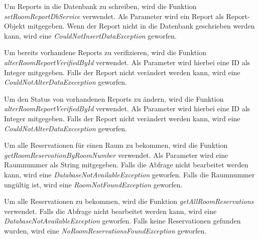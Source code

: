 

Um Reports in die Datenbank zu schreiben, wird die Funktion \emph{setRoomReportDbService} verwendet. Als Parameter wird ein Report als Report-Objekt mitgegeben. Wenn der Report nicht in die Datenbank geschrieben werden kann, wird eine \emph{CouldNotInsertDataException} geworfen.



Um bereits vorhandene Reports zu verifizieren, wird die Funktion \emph{alterRoomReportVerifiedById} verwendet. Als Parameter wird hierbei eine ID als Integer mitgegeben. Falls der Report nicht verändert werden kann, wird eine \emph{CouldNotAlterDataExcception} geworfen.


Um den Status von vorhandenen Reports zu ändern, wird die Funktion \emph{alterRoomReportVerifiedById} verwendet. Als Parameter wird hierbei eine ID als Integer mitgegeben. Falls der Report nicht verändert werden kann, wird eine \emph{CouldNotAlterDataExcception} geworfen.


Um alle Reservationen für einen Raum zu bekommen, wird die Funktion \emph{getRoomReservationByRoomNumber} verwendet. Als Parameter wird eine Raumnummer als String mitgegeben. Falls die Abfrage nicht bearbeitet werden kann, wird eine \emph{DatabaseNotAvailableException} geworfen. Falls die Raumnummer ungültig ist, wird eine \emph{RoomNotFoundException} geworfen.


Um alle Reservationen zu bekommen, wird die Funktion \emph{getAllRoomReservations} verwendet. Falls die Abfrage nicht bearbeitet werden kann, wird eine \emph{DatabaseNotAvailableException} geworfen. Falls keine Reservationen gefunden wurden, wird eine \emph{NoRoomReservationsFoundException} geworfen.


